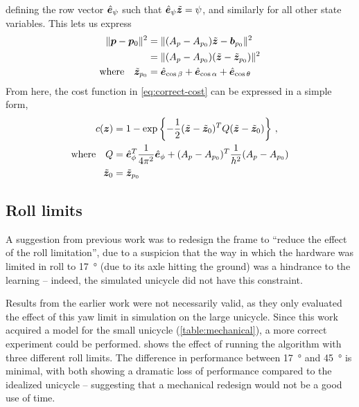 \documentclass[main.tex]{subfiles}
\begin{document}
	defining the row vector $\hat{\bm{e}}_{\psi}$ such that $\hat{\bm{e}}_{\psi}\tilde{\bm{z}} = \psi$, and similarly for all other state variables.
	This lets us express
	\begin{align}
		\|\bm{p} - \bm{p}_0\|^2
			&= \|(A_p - A_{p_0})\tilde{\bm{z}} - \bm{b}_{p_0}\|^2  \nonumber \\
			&= \|(A_p - A_{p_0})(\tilde{\bm{z}} - \tilde{\bm{z}}_{p_0})\|^2 \\
		\text{where}\quad\tilde{\bm{z}}_{p_0}
			&= \hat{\bm{e}}_{\cos \beta} + \hat{\bm{e}}_{\cos \alpha} + \hat{\bm{e}}_{\cos \theta}  \nonumber
	\end{align}
	From here, the cost function in \cref{eq:correct-cost} can be expressed in a simple form,
	\begin{align}
		c(\bm z) &= 1 - \exp\left\{-\frac{1}{2}
			(\tilde{\bm{z}} - \tilde{\bm{z}}_0)^T  Q (\tilde{\bm{z}} - \tilde{\bm{z}}_0)
		\right\} \,, \label{eq:quad-cost} \\
		\text{where}\quad Q &=
			\hat{\bm{e}}_{\phi}^T\frac{1}{4\pi^2}\hat{\bm{e}}_{\phi} +
			(A_p - A_{p_0})^T\frac{1}{h^2}(A_p - A_{p_0}) \nonumber \\
			\tilde{\bm{z}}_0 &= \tilde{\bm{z}}_{p_0} \nonumber
	\end{align}

\subsection{Roll limits}
	A suggestion from previous work was to redesign the frame to \enquote{reduce the effect of the roll limitation}\cite[p.~35]{aleksi}, due to a suspicion that the way in which the hardware was limited in roll to \SI{17}{\degree} (due to its axle hitting the ground) was a hindrance to the learning -- indeed, the simulated unicycle did not have this constraint.

	Results from the earlier work were not necessarily valid, as they only evaluated the effect of this yaw limit in simulation on the large unicycle.
	Since this work acquired a model for the small unicycle (\cref{table:mechanical}), a more correct experiment could be performed.
	 shows the effect of running the algorithm with three different roll limits.
	The difference in performance between \SI{17}{\degree} and \SI{45}{\degree} is minimal, with both showing a dramatic loss of performance compared to the idealized unicycle -- suggesting that a mechanical redesign would not be a good use of time.
\end{document}
